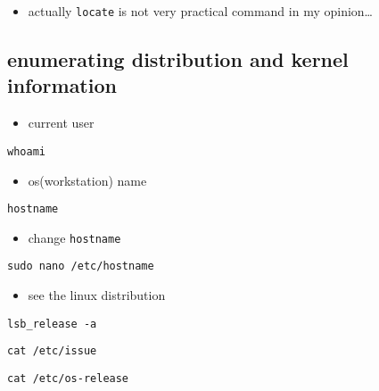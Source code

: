 \documentclass[
]{article}
\providecommand{\tightlist}{%
  \setlength{\itemsep}{0pt}\setlength{\parskip}{0pt}}
\begin{document}
\begin{itemize}
\tightlist
\item
  actually \texttt{locate} is not very practical command in my
  opinion\ldots{}
\end{itemize}

\hypertarget{enumerating-distribution-and-kernel-information}{%
\subsection{enumerating distribution and kernel
information}\label{enumerating-distribution-and-kernel-information}}

\begin{itemize}
\tightlist
\item
  current user
\end{itemize}

\begin{verbatim}
whoami
\end{verbatim}

\begin{itemize}
\tightlist
\item
  os(workstation) name
\end{itemize}

\begin{verbatim}
hostname
\end{verbatim}

\begin{itemize}
\tightlist
\item
  change \texttt{hostname}
\end{itemize}

\begin{verbatim}
sudo nano /etc/hostname
\end{verbatim}

\begin{itemize}
\tightlist
\item
  see the linux distribution
\end{itemize}

\begin{verbatim}
lsb_release -a
\end{verbatim}

\begin{verbatim}
cat /etc/issue
\end{verbatim}

\begin{verbatim}
cat /etc/os-release
\end{verbatim}
\end{document}
